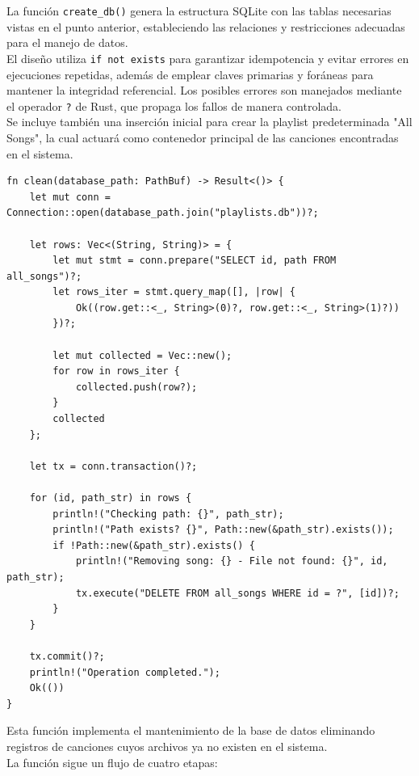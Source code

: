 \documentclass[11pt, a4paper]{article}
\begin{document}
            La función \texttt{create\_db()} genera la estructura SQLite con las tablas necesarias vistas en el punto anterior, estableciendo las relaciones y restricciones adecuadas para el manejo de datos. \\

            El diseño utiliza \texttt{if not exists} para garantizar idempotencia y evitar errores en ejecuciones repetidas, además de emplear claves primarias y foráneas para mantener la integridad referencial. Los posibles errores son manejados mediante el operador \texttt{?} de Rust, que propaga los fallos de manera controlada. \\

            Se incluye también una inserción inicial para crear la playlist predeterminada "All Songs", la cual actuará como contenedor principal de las canciones encontradas en el sistema.

            \begin{lstlisting}[caption={fn clean()}]
fn clean(database_path: PathBuf) -> Result<()> {
    let mut conn = Connection::open(database_path.join("playlists.db"))?;

    let rows: Vec<(String, String)> = {
        let mut stmt = conn.prepare("SELECT id, path FROM all_songs")?;
        let rows_iter = stmt.query_map([], |row| {
            Ok((row.get::<_, String>(0)?, row.get::<_, String>(1)?))
        })?;

        let mut collected = Vec::new();
        for row in rows_iter {
            collected.push(row?);
        }
        collected
    };

    let tx = conn.transaction()?;

    for (id, path_str) in rows {
        println!("Checking path: {}", path_str);
        println!("Path exists? {}", Path::new(&path_str).exists()); 
        if !Path::new(&path_str).exists() {
            println!("Removing song: {} - File not found: {}", id, path_str);
            tx.execute("DELETE FROM all_songs WHERE id = ?", [id])?;
        }
    }

    tx.commit()?;
    println!("Operation completed.");
    Ok(())
}
            \end{lstlisting}

            Esta función implementa el mantenimiento de la base de datos eliminando registros de canciones cuyos archivos ya no existen en el sistema. \\

            La función sigue un flujo de cuatro etapas:
\end{document}
